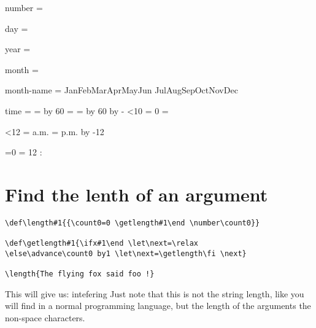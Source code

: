 \begin{comment}
Typing \texttt{\string\weekday\{12\}} will give you an error: 

 \weekday{12} \sidenote{Not a real error, but we need to start thinking as to how to catch errors!}\sidenote{\jobname, ~ \today }
\end{comment}

\begin{teX}
\def\monthname{%
\ifcase\month
\or Jan\or Feb\or Mar\or Apr\or May\or Jun%
\or Jul\or Aug\or Sep\or Oct\or Nov\or Dec%
\fi}%
\def\timestring{\begingroup
\count0 = \time \divide\count0 by 60
\count2 = \count0 %
\count4 = \time \multiply\count0 by 60
\advance\count4 by -\count0 %
\ifnum\count4<10 \toks1 = {0}%
\else \toks1 = {}%
\fi

\ifnum\count2<12 \toks0 = {a.m.}%
\else \toks0 = {p.m.}%
\advance\count2 by -12
\fi

\ifnum\count2=0 \count2 = 12 \fi 
\number\count2:\the\toks1 \number\count4
\thinspace \the\toks0
\endgroup}%

\def\timestamp{\number\day\space\monthname\space
\number\year\quad\timestring}%

number = \number

day = \day 

year =\year

month = \month

month-name  = \monthname 8

time = \timestring
\end{teX}

\section{Find the lenth of an argument}

\begin{verbatim}
\def\length#1{{\count0=0 \getlength#1\end \number\count0}}

\def\getlength#1{\ifx#1\end \let\next=\relax
\else\advance\count0 by1 \let\next=\getlength\fi \next}

\length{The flying fox said foo !}
\end{verbatim}


This will give us:  \TODO intefering  Just note that this is not the string length, like you will find in a normal programming language, but the length of the arguments \ie the non-space characters.

